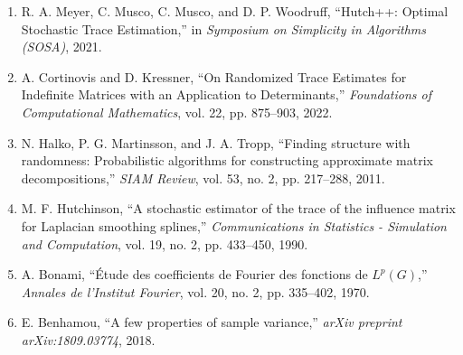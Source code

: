 \documentclass[11pt,letterpaper]{article}
\begin{document}
\begin{enumerate}
    \item R. A. Meyer, C. Musco, C. Musco, and D. P. Woodruff, ``Hutch++: Optimal Stochastic Trace Estimation,'' in \textit{Symposium on Simplicity in Algorithms (SOSA)}, 2021.
    \item A. Cortinovis and D. Kressner, ``On Randomized Trace Estimates for Indefinite Matrices with an Application to Determinants,'' \textit{Foundations of Computational Mathematics}, vol. 22, pp. 875--903, 2022.
    \item N. Halko, P. G. Martinsson, and J. A. Tropp, ``Finding structure with randomness: Probabilistic algorithms for constructing approximate matrix decompositions,'' \textit{SIAM Review}, vol. 53, no. 2, pp. 217--288, 2011.
    \item M. F. Hutchinson, ``A stochastic estimator of the trace of the influence matrix for Laplacian smoothing splines,'' \textit{Communications in Statistics - Simulation and Computation}, vol. 19, no. 2, pp. 433--450, 1990.
    \item A. Bonami, ``Étude des coefficients de Fourier des fonctions de $L^p(G)$,'' \textit{Annales de l'Institut Fourier}, vol. 20, no. 2, pp. 335--402, 1970.
    \item E. Benhamou, ``A few properties of sample variance,'' \textit{arXiv preprint arXiv:1809.03774}, 2018.
\end{enumerate}
\end{document}
